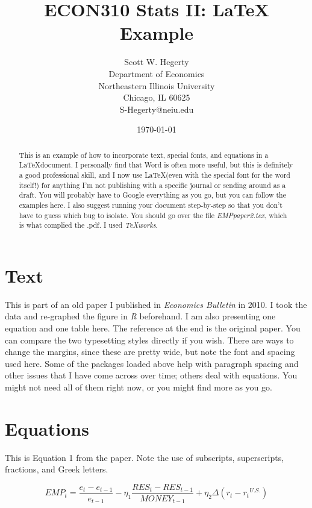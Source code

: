 \documentclass[letterpaper]{article}
\begin{document}
\title{ECON310 Stats II: LaTeX Example}
\author{Scott W. Hegerty\\
Department of Economics\\
Northeastern Illinois University\\
Chicago, IL 60625\\S-Hegerty@neiu.edu
}
\date{\today}
\maketitle


\begin{abstract}
This is an example of how to incorporate text, special fonts, and equations in a \LaTeX document. I personally find that Word is often more useful, but this is definitely a good professional skill, and I now use \LaTeX (even with the special font for the word itself!) for anything I'm not publishing with a specific journal or sending around as a draft. You will probably have to Google everything as you go, but you can follow the examples here. I also suggest running your document step-by-step so that you don't have to guess which bug to isolate. You should go over the file \textit{EMPpaper2.tex}, which is what complied the .pdf. I used \textit{TeXworks}.
\end{abstract}

\section{Text}
This is part of an old paper I published in\textit{ Economics Bulletin} in 2010. I took the data and re-graphed the figure in \textit{R} beforehand. I am also presenting one equation and one table here. The reference at the end is the original paper. You can compare the two typesetting styles directly if you wish.
There are ways to change the margins, since these are pretty wide, but note the font and spacing used here. Some of the packages loaded above help with paragraph spacing and other issues that I have come across over time; others deal with equations. You might not need all of them right now, or you might find more as you go.


\section{Equations}
This is Equation 1 from the paper. Note the use of subscripts, superscripts,
fractions, and Greek letters.

\begin{equation}
EMP_t = \frac{e_t - e_{t-1}}{e_{t-1}} - \eta_1\frac{RES_t - RES_{t-1}}{MONEY_{t-1}} + \eta_2 \Delta (r_t - r_t{^{U.S.}})
\end{equation}
\end{document}
